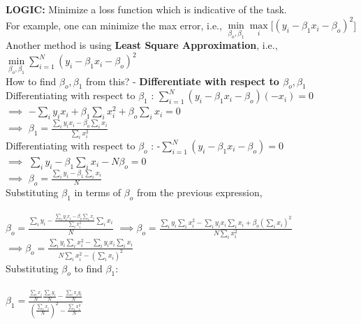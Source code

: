 \documentclass[12pt]{article}
\begin{document}
\textbf{LOGIC:} Minimize a loss function which is indicative of the task.\\
For example, one can minimize the max error, i.e., $ \min\limits_{\beta_o,\beta_1}  \max\limits_{i}    [(y_i-\beta_1 x_i - \beta_o)^2$]\\
Another method is using \textbf{Least Square Approximation}, i.e., $\min\limits_{\beta_o, \beta_1} \sum\limits_{i=1}^{N} (y_i-\beta_1 x_i - \beta_o)^2$\\
How to find $\beta_o, \beta_1$ from this? - \textbf{Differentiate with respect to $\beta_o, \beta_1$}\\
Differentiating with respect to $\beta_1$ : $\sum\limits_{i=1}^{N} (y_i-\beta_1 x_i - \beta_o)(-x_i) = 0$\\
$\implies$ $-\sum\limits_{i} y_i x_i + \beta_1 \sum\limits_{i} x_i^2 + \beta_o \sum\limits_{i} x_i = 0$\\
\large $\implies$ $\beta_1 = \frac{\sum\limits_{i}y_i x_i - \beta_o \sum\limits_{i}x_i}{\sum\limits_{i} x_i^2}$\\
\normalsize Differentiating with respect to $\beta_o$ : -$\sum\limits_{i=1}^{N} (y_i - \beta_1 x_i - \beta_o) = 0$\\
$\implies$ $\sum\limits_{i} y_i - \beta_1 \sum\limits_{i} x_i - N\beta_o = 0$\\
\large $\implies$ $\beta_o = \frac{\sum\limits_{i} y_i - \beta_1 \sum\limits_{i} x_i}{N}$\\
\normalsize Substituting $\beta_1$ in terms of $\beta_o$ from the previous expression,\\
\\
\large {$\beta_o = \frac{\sum\limits_{i} y_i - \frac{\sum\limits_{i} y_i x_i - \beta_o \sum\limits_{i} x_i}{\sum\limits_{i} x_i^2} \sum\limits_{i} x_i}{N}$ }
$\implies  \beta_o = \frac{\sum\limits_{i} y_i \sum\limits_{i} x_i^2 - \sum\limits_{i} y_i x_i \sum\limits_{i} x_i + \beta_o (\sum\limits_{i} x_i)^2}{N \sum\limits_{i} x_i^2}$\\
$\implies \beta_o = \frac{\sum\limits_{i} y_i \sum\limits_{i} x_i^2 - \sum\limits_{i} y_i x_i \sum\limits_{i} x_i}{N \sum\limits_{i} x_i^2 - (\sum\limits_{i} x_i)^2}$\\
\normalsize Substituting $\beta_o$ to find $\beta_1$:\\
\\
\large $\beta_1 = \frac{\frac{\sum\limits_{i} x_i}{N} \frac{\sum\limits_{i} y_i}{N} - \frac{\sum\limits_{i} x_i y_i}{N}}{(\frac{\sum\limits_{i} x_i}{N})^2 - \frac{\sum\limits_{i} x_i^2}{N}}$\\
\end{document}
